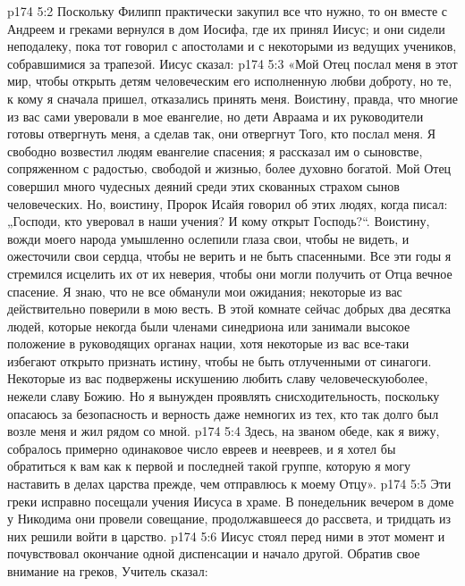\vs p174 5:2 Поскольку Филипп практически закупил все что нужно, то он вместе с Андреем и греками вернулся в дом Иосифа, где их принял Иисус; и они сидели неподалеку, пока тот говорил с апостолами и с некоторыми из ведущих учеников, собравшимися за трапезой. Иисус сказал:
\vs p174 5:3 \pc «Мой Отец послал меня в этот мир, чтобы открыть детям человеческим его исполненную любви доброту, но те, к кому я сначала пришел, отказались принять меня. Воистину, правда, что многие из вас сами уверовали в мое евангелие, но дети Авраама и их руководители готовы отвергнуть меня, а сделав так, они отвергнут Того, кто послал меня. Я свободно возвестил людям евангелие спасения; я рассказал им о сыновстве, сопряженном с радостью, свободой и жизнью, более духовно богатой. Мой Отец совершил много чудесных деяний среди этих скованных страхом сынов человеческих. Но, воистину, Пророк Исайя говорил об этих людях, когда писал: „Господи, кто уверовал в наши учения? И кому открыт Господь?“. Воистину, вожди моего народа умышленно ослепили глаза свои, чтобы не видеть, и ожесточили свои сердца, чтобы не верить и не быть спасенными. Все эти годы я стремился исцелить их от их неверия, чтобы они могли получить от Отца вечное спасение. Я знаю, что не все обманули мои ожидания; некоторые из вас действительно поверили в мою весть. В этой комнате сейчас добрых два десятка людей, которые некогда были членами синедриона или занимали высокое положение в руководящих органах нации, хотя некоторые из вас все\hyp{}таки избегают открыто признать истину, чтобы не быть отлученными от синагоги. Некоторые из вас подвержены искушению любить славу человеческуюболее, нежели славу Божию. Но я вынужден проявлять снисходительность, поскольку опасаюсь за безопасность и верность даже немногих из тех, кто так долго был возле меня и жил рядом со мной.
\vs p174 5:4 Здесь, на званом обеде, как я вижу, собралось примерно одинаковое число евреев и неевреев, и я хотел бы обратиться к вам как к первой и последней такой группе, которую я могу наставить в делах царства прежде, чем отправлюсь к моему Отцу».
\vs p174 5:5 Эти греки исправно посещали учения Иисуса в храме. В понедельник вечером в доме у Никодима они провели совещание, продолжавшееся до рассвета, и тридцать из них решили войти в царство.
\vs p174 5:6 Иисус стоял перед ними в этот момент и почувствовал окончание одной диспенсации и начало другой. Обратив свое внимание на греков, Учитель сказал:
